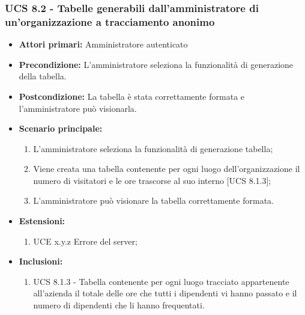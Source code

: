 \subsubsection{UCS 8.2 - Tabelle generabili dall'amministratore di un'organizzazione a tracciamento anonimo}%
\begin{itemize}
\item \textbf{Attori primari:} Amministratore autenticato
\item \textbf{Precondizione:} L'amministratore seleziona la funzionalità di generazione della tabella.
\item \textbf{Postcondizione:} La tabella è stata correttamente formata e l'amministratore può visionarla.
\item \textbf{Scenario principale:}
	\begin{enumerate}%
	\item L'amministratore seleziona la funzionalità di generazione tabella;
	\item Viene creata una tabella contenente per ogni luogo dell'organizzazione il numero di visitatori e le ore trascorse al suo interno [UCS 8.1.3];
	\item L'amministratore può visionare la tabella correttamente formata.
\end{enumerate}
\item \textbf{Estensioni:}
	\begin{enumerate}
		\item UCE x.y.z Errore del server;
	\end{enumerate}
\item \textbf{Inclusioni:} 
\begin{enumerate}
		\item UCS 8.1.3 - Tabella contenente per ogni luogo tracciato appartenente all'azienda il totale delle ore che tutti i dipendenti vi hanno passato e il numero di dipendenti che li hanno frequentati.
	\end{enumerate}
\end{itemize}
